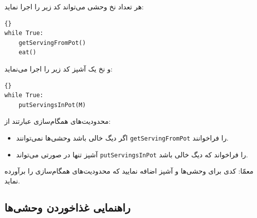 \documentclass{book}
\newcommand{\clearemptydoublepage}{\newpage\cleardoublepage}
\begin{document}
    هر تعداد نخ وحشی می‌تواند کد زیر را اجرا نماید:

\begin{latin}
\begin{lstlisting}[title=\rl{کد ناهمگام یک وحشی}]{}
while True:
    getServingFromPot()
    eat()
\end{lstlisting}
\end{latin}

    و نخ یک آشپز کد زیر را اجرا می‌نماید:

\begin{latin}
\begin{lstlisting}[title=\rl{کد ناهمگام آشپز}]{}
while True:
    putServingsInPot(M)
\end{lstlisting}
\end{latin}

    محدودیت‌های همگام‌سازی عبارتند از:

\begin{itemize}

\item 
    اگر دیگ خالی باشد وحشی‌ها نمی‌توانند {\tt getServingFromPot}  را فراخوانند. 

\item 
    آشپز تنها در صورتی می‌تواند  {\tt putServingsInPot} را فراخواند که دیگ خالی باشد. 

\end{itemize}

    معمّا: کدی برای وحشی‌ها و آشپز اضافه نمایید که محدودیت‌های همگام‌سازی را برآورده نماید. 

\clearemptydoublepage
\subsection{راهنمایی غذاخوردن وحشی‌ها}
\end{document}

